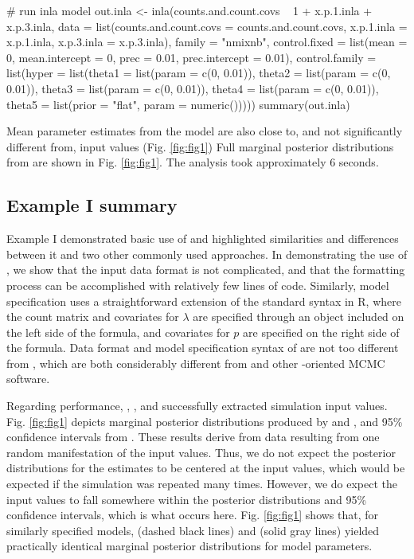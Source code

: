\documentclass[article]{jss}
\begin{document}
\begin{Code}
# run inla model
out.inla <- inla(counts.and.count.covs ~ 1 + x.p.1.inla + x.p.3.inla,
         data = list(counts.and.count.covs = counts.and.count.covs,
                     x.p.1.inla = x.p.1.inla, x.p.3.inla = x.p.3.inla),
         family = "nmixnb",
         control.fixed = list(mean = 0, mean.intercept = 0, prec = 0.01,
                              prec.intercept = 0.01),
         control.family = list(hyper = list(theta1 = list(param = c(0, 0.01)),
                                          theta2 = list(param = c(0, 0.01)),
                                          theta3 = list(param = c(0, 0.01)),
                                          theta4 = list(param = c(0, 0.01)),
                                          theta5 = list(prior = "flat",
                                                        param = numeric()))))
summary(out.inla)
\end{Code}

Mean parameter estimates from the  model are also close to, and not significantly different from, input values (Fig. \ref{fig:fig1})  Full marginal posterior distributions from  are shown in Fig. \ref{fig:fig1}.  The analysis took approximately 6 seconds.

\subsection[Example I summary]{Example I summary}
Example I demonstrated basic use of  and highlighted similarities and differences between it and two other commonly used approaches.  In demonstrating the use of , we show that the input data format is not complicated, and that the formatting process can be accomplished with relatively few lines of code.  Similarly, model specification uses a straightforward extension of the standard syntax in R, where the count matrix and covariates for $\lambda$ are specified through an  object included on the left side of the formula, and covariates for $p$ are specified on the right side of the formula. Data format and model specification syntax of  are not too different from , which are both considerably different from  and other -oriented MCMC software.

Regarding performance, , , and  successfully extracted simulation input values.  Fig. \ref{fig:fig1} depicts marginal posterior distributions produced by  and , and 95\% confidence intervals from .   These results derive from data resulting from one random manifestation of the input values.  Thus, we do not expect the posterior distributions for the estimates to be centered at the input values, which would be expected if the simulation was repeated many times.  However, we do expect the input values to fall somewhere within the posterior distributions and 95\% confidence intervals, which is what occurs here.  Fig. \ref{fig:fig1} shows that, for similarly specified models,  (dashed black lines) and  (solid gray lines) yielded practically identical marginal posterior distributions for model parameters.
\end{document}
